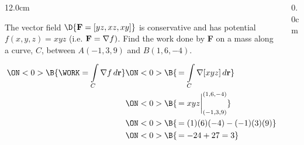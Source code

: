 \begin{frame}
\begin{columns}\begin{column}{12.0cm}

\vspace{0.1cm}

\scriptsize

\EX The vector field $\D{{\bf F} = [yz,xz,xy]}$ is conservative and has potential $f(x,y,z) = xyz$ (i.e. ${\bf F} = \nabla f)$.  Find the work done by {\bf F} on a mass along a curve, $C$, between $A(-1,3,9)$ and $B(1,6,-4)$. 

\vspace{0.2cm}

\SOL {}

\vspace{0.2cm}

\begin{align*}
	\ON<0>{\B{\WORK 
	    = \int \limits_{C} \nabla f \, d{\bf r} }}
	&\ON<0>{\B{\, = \int \limits_{C} \nabla[xyz] \, d{\bf r}}} \\
	&\ON<0>{\B{\, = xyz\biggr|_{(-1,3,9)}^{(1,6,-4)}}} \\
	&\ON<0>{\B{\, = (1)(6)(-4) - (-1)(3)(9)}} \\
	&\ON<0>{\B{\, = -24 + 27 = 3}}\\
\end{align*}

\vspace{3.2cm}

\end{column}\begin{column}{0.0cm}\end{column}\end{columns}
\end{frame}

